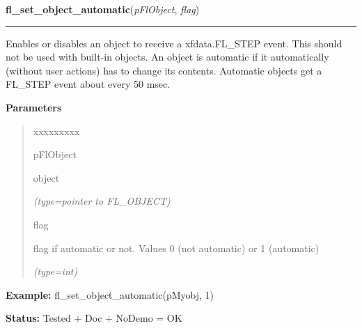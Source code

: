 \hspace{.8\funcindent}\begin{boxedminipage}{\funcwidth}

    \raggedright \textbf{fl\_set\_object\_automatic}(\textit{pFlObject}, \textit{flag})

    \vspace{-1.5ex}

    \rule{\textwidth}{0.5\fboxrule}
\setlength{\parskip}{2ex}
    Enables or disables an object to receive a xfdata.FL\_STEP event. This 
    should not be used with built-in objects. An object is automatic if it 
    automatically (without user actions) has to change its contents. 
    Automatic objects get a FL\_STEP event about every 50 msec.

\setlength{\parskip}{1ex}
      \textbf{Parameters}
      \vspace{-1ex}

      \begin{quote}
        \begin{Ventry}{xxxxxxxxx}

          \item[pFlObject]

          object

            {\it (type=pointer to FL\_OBJECT)}

          \item[flag]

          flag if automatic or not. Values 0 (not automatic) or 1 
          (automatic)

            {\it (type=int)}

        \end{Ventry}

      \end{quote}

\textbf{Example:} fl\_set\_object\_automatic(pMyobj, 1)



\textbf{Status:} Tested + Doc + NoDemo = OK



    \end{boxedminipage}

    \label{xformslib:flbasic:fl_object_is_automatic}

    \vspace{0.5ex}

